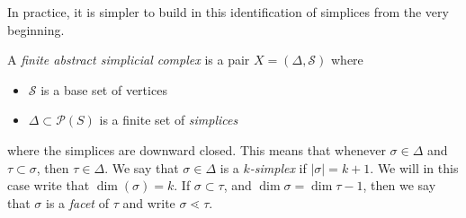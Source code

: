 In practice, it is simpler to build in this identification of simplices from the very beginning.   
\begin{definition}
	A \emph{finite abstract simplicial complex} is a pair $X=(\Delta, \mathcal S)$ where
	\begin{itemize}
	\item  $\mathcal S$ is a base set of vertices
	\item $\Delta\subset \mathcal P(S)$ is a finite set of \emph{simplices} 
	\end{itemize}
	where the simplices are downward closed. This means that whenever $\sigma\in \Delta$ and $\tau\subset \sigma$, then $\tau\in \Delta$. We say that $\sigma\in \Delta$ is a \emph{$k$-simplex} if $|\sigma|=k+1.$ We will in this case write that $\dim(\sigma)=k$. 
	If $\sigma\subset \tau$, and $\dim\sigma=\dim\tau-1$, then we say that $\sigma$ is a \emph{facet} of $\tau$ and write $\sigma \lessdot \tau$. 
	
\end{definition}


